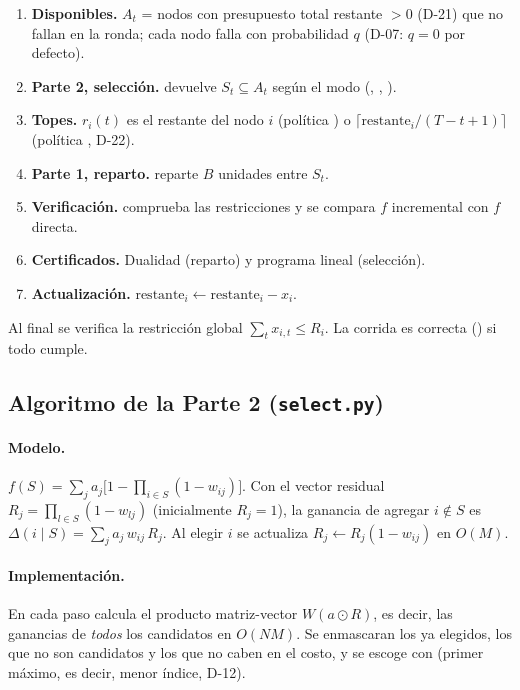 \documentclass[11pt,a4paper]{article}
\begin{document}
\begin{enumerate}[leftmargin=*]
\item \textbf{Disponibles.} $A_t$ = nodos con presupuesto total restante $>0$ (D-21) que no fallan en la ronda; cada nodo falla con probabilidad $q$ (D-07: $q=0$ por defecto).
\item \textbf{Parte 2, selección.}  devuelve $S_t\subseteq A_t$ según el modo (, , ).
\item \textbf{Topes.} $r_i(t)$ es el restante del nodo $i$ (política ) o $\lceil \mathrm{restante}_i/(T-t+1)\rceil$ (política , D-22).
\item \textbf{Parte 1, reparto.}  reparte $B$ unidades entre $S_t$.
\item \textbf{Verificación.}  comprueba las restricciones y se compara $f$ incremental con $f$ directa.
\item \textbf{Certificados.} Dualidad (reparto) y programa lineal (selección).
\item \textbf{Actualización.} $\mathrm{restante}_i \leftarrow \mathrm{restante}_i - x_i$.
\end{enumerate}

Al final se verifica la restricción global $\sum_t x_{i,t}\le R_i$. La corrida es correcta () si todo cumple.

\subsection{Algoritmo de la Parte 2 (\texttt{select.py})}

\paragraph{Modelo.} $f(S)=\sum_j a_j\bigl[1-\prod_{i\in S}(1-w_{ij})\bigr]$. Con el vector residual $R_j=\prod_{l\in S}(1-w_{lj})$ (inicialmente $R_j=1$), la ganancia de agregar $i\notin S$ es $\Delta(i\mid S)=\sum_j a_j\,w_{ij}\,R_j$. Al elegir $i$ se actualiza $R_j\leftarrow R_j(1-w_{ij})$ en $O(M)$.

\paragraph{Implementación.} En cada paso  calcula el producto matriz-vector $W(a\odot R)$, es decir, las ganancias de \emph{todos} los candidatos en $O(NM)$. Se enmascaran los ya elegidos, los que no son candidatos y los que no caben en el costo, y se escoge con  (primer máximo, es decir, menor índice, D-12).
\end{document}
